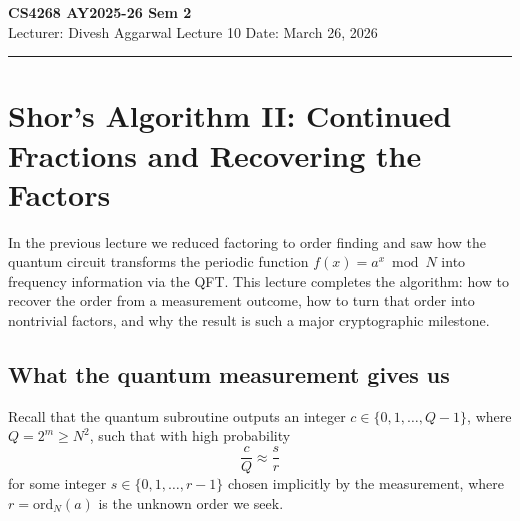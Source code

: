 



% 


\newpage
\noindent
\textbf{CS4268 AY2025-26 Sem 2}
\\
\noindent
Lecturer: Divesh Aggarwal
\hfill
Lecture 10                      %
\hfill
Date: March 26, 2026          %


\noindent
\rule{\textwidth}{1pt}

\medskip


\section{Shor's Algorithm II: Continued Fractions and Recovering the Factors}

In the previous lecture we reduced factoring to order finding and saw how the quantum circuit transforms the periodic function $f(x)=a^x \bmod N$ into frequency information via the QFT. This lecture completes the algorithm: how to recover the order from a measurement outcome, how to turn that order into nontrivial factors, and why the result is such a major cryptographic milestone.

\subsection{What the quantum measurement gives us}

Recall that the quantum subroutine outputs an integer $c \in \{0,1,\dots,Q-1\}$, where $Q=2^m \geq N^2$, such that with high probability
\[
    \frac{c}{Q} \approx \frac{s}{r}
\]
for some integer $s \in \{0,1,\dots,r-1\}$ chosen implicitly by the measurement, where $r=\mathrm{ord}_N(a)$ is the unknown order we seek.

